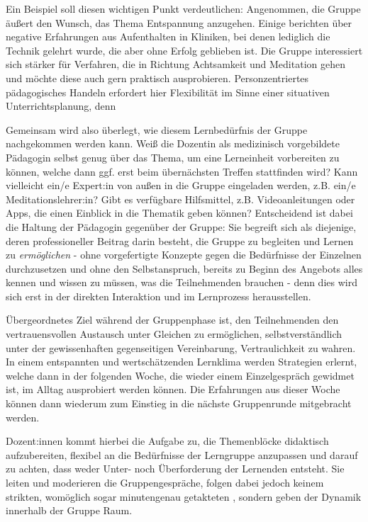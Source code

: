 \documentclass[
  twoside,
  parskip=half-,
]{scrreprt}
\begin{document}
\begin{praxis}Ein Beispiel soll diesen wichtigen Punkt verdeutlichen: Angenommen, die Gruppe äußert den Wunsch, das Thema Entspannung anzugehen. Einige berichten über negative Erfahrungen aus Aufenthalten in Kliniken, bei denen lediglich die Technik  gelehrt wurde, die aber ohne Erfolg geblieben ist. Die Gruppe interessiert sich stärker für Verfahren, die in Richtung Achtsamkeit und Meditation gehen und möchte diese auch gern praktisch ausprobieren. Personzentriertes pädagogisches Handeln erfordert hier Flexibilität im Sinne einer situativen Unterrichtsplanung, denn  
  
  Gemeinsam wird also überlegt, wie diesem Lernbedürfnis der Gruppe nachgekommen werden kann. Weiß die Dozentin als medizinisch vorgebildete Pädagogin selbst genug über das Thema, um eine Lerneinheit vorbereiten zu können, welche dann ggf. erst beim übernächsten Treffen stattfinden wird? Kann vielleicht ein/e Expert:in von außen in die Gruppe eingeladen werden, z.B. ein/e Meditationslehrer:in? Gibt es verfügbare Hilfsmittel, z.B. Videoanleitungen oder Apps, die einen Einblick in die Thematik geben können? Entscheidend ist dabei die Haltung der Pädagogin gegenüber der Gruppe: Sie begreift sich als diejenige, deren professioneller Beitrag darin besteht, die Gruppe zu begleiten und Lernen zu \textit{ermöglichen} - ohne vorgefertigte Konzepte gegen die Bedürfnisse der Einzelnen durchzusetzen und ohne den Selbstanspruch, bereits zu Beginn des Angebots alles kennen und wissen zu müssen, was die Teilnehmenden brauchen - denn dies wird sich erst in der direkten Interaktion und im Lernprozess herausstellen.
\end{praxis}

Übergeordnetes Ziel während der Gruppenphase ist, den Teilnehmenden den vertrauensvollen Austausch unter Gleichen zu ermöglichen, selbstverständlich unter der gewissenhaften gegenseitigen Vereinbarung, Vertraulichkeit zu wahren. In einem entspannten und wertschätzenden Lernklima werden Strategien erlernt, welche dann in der folgenden Woche, die wieder einem Einzelgespräch gewidmet ist, im Alltag ausprobiert werden können. Die Erfahrungen aus dieser Woche können dann wiederum zum Einstieg in die nächste Gruppenrunde mitgebracht werden.

Dozent:innen kommt hierbei die Aufgabe zu, die Themenblöcke didaktisch aufzubereiten, flexibel an die Bedürfnisse der Lerngruppe anzupassen und darauf zu achten, dass weder Unter- noch Überforderung der Lernenden entsteht. Sie leiten und moderieren die Gruppengespräche, folgen dabei jedoch keinem strikten, womöglich sogar minutengenau getakteten , sondern geben der Dynamik innerhalb der Gruppe Raum. 
\end{document}
